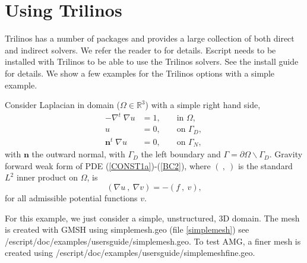 
%
%
%

\chapter{Using Trilinos}
\label{TRILINOS}
Trilinos has a number of packages and provides a large collection of both direct and indirect solvers.  We refer the reader to \cite{TrilinosWeb} for details.  Escript needs to be installed with Trilinos to be able to use the Trilinos solvers.  See the install guide for details.  We show a few examples for the Trilinos options with a simple example.

Consider Laplacian in domain ($\Omega\in \mathbb{R}^3$) with a simple right hand side,
\begin{align}
 -\nabla^t\; \nabla u &= 1,  &&\text{ in } \Omega, \label{CONST1a}\\
 u &= 0, &&\text{ on } \Gamma_D,\label{BC1}\\
 \mathbf{n}^t \; \nabla u &= 0, &&\text{ on }\Gamma_N,\,\label{BC2}
\end{align} 
with $\mathbf{n}$ the outward normal, with $\Gamma_D$ the left boundary and $\Gamma=\partial\Omega\backslash\Gamma_D$.  Gravity forward weak form of PDE (\ref{CONST1a})-(\ref{BC2}), where $(~,~)$ is the standard $L^2$ inner product on $\Omega$, is
\begin{equation}\label{weak}
(\nabla u ~,~\nabla v ) = -(f ~,~v ),   
\end{equation}
for all admissible potential functions $v$. 


For this example, we just consider a simple, unstructured, 3D domain.  The mesh is created with GMSH using simplemesh.geo (file \ref{simplemesh}) see /escript/doc/examples/usersguide/simplemesh.geo.  To test AMG, a finer mesh is created using    /escript/doc/examples/usersguide/simplemeshfine.geo.

